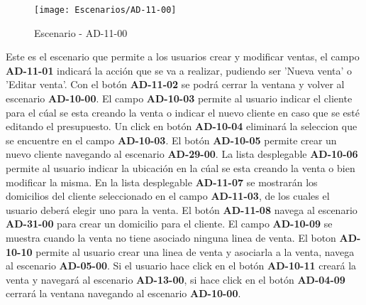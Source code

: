 \begin{figure}[H]
\centering
\texttt{[image: Escenarios/AD-11-00]}
\caption{Escenario - AD-11-00}
\label{fig:AD-11-00}
\end{figure}
Este es el escenario que permite a los usuarios crear y modificar ventas, el campo \textbf{AD-11-01} indicará la acción que se va a realizar, pudiendo ser 'Nueva venta' o 'Editar venta'. Con el botón \textbf{AD-11-02} se podrá cerrar la ventana y volver al escenario \textbf{AD-10-00}.
El campo \textbf{AD-10-03} permite al usuario indicar el cliente para el cúal se esta creando la venta o indicar el nuevo cliente en caso que se esté editando el presupuesto. Un click en botón \textbf{AD-10-04} eliminará la seleccion que se encuentre en el campo \textbf{AD-10-03}. El botón \textbf{AD-10-05} permite crear un nuevo cliente navegando al escenario \textbf{AD-29-00}. La lista desplegable \textbf{AD-10-06} permite al usuario indicar la ubicación en la cúal se esta creando la venta o bien modificar la misma. En la lista desplegable \textbf{AD-11-07} se mostrarán los domicilios del cliente seleccionado en el campo \textbf{AD-11-03}, de los cuales el usuario deberá elegir uno para la venta. El botón \textbf{AD-11-08} navega al escenario \textbf{AD-31-00} para crear un domicilio para el cliente.
El campo \textbf{AD-10-09} se muestra cuando la venta no tiene asociado ninguna linea de venta. El boton \textbf{AD-10-10} permite al usuario crear una linea de venta y asociarla a la venta, navega al escenario \textbf{AD-05-00}. Si el usuario hace click en el botón \textbf{AD-10-11} creará la venta y navegará al escenario \textbf{AD-13-00}, si hace click en el botón \textbf{AD-04-09} cerrará la ventana navegando al escenario \textbf{AD-10-00}.
\clearpage
